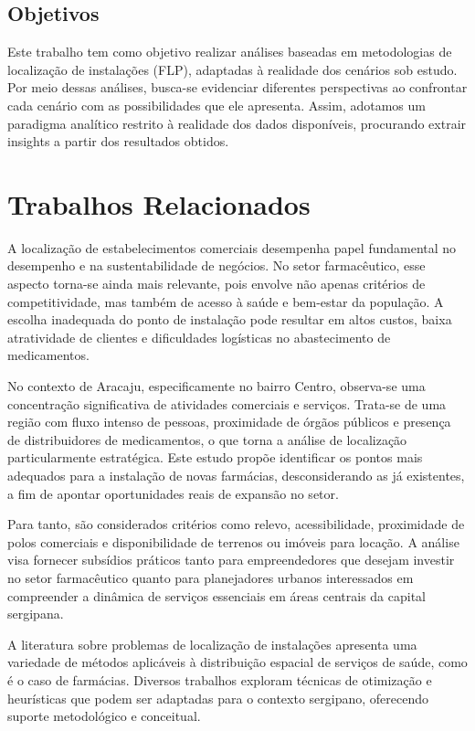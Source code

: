 \documentclass[12pt]{article}
\begin{document}
\subsection{Objetivos}

Este trabalho tem como objetivo realizar análises baseadas em metodologias de localização de instalações (FLP), adaptadas à realidade dos cenários sob estudo. Por meio dessas análises, busca-se evidenciar diferentes perspectivas ao confrontar cada cenário com as possibilidades que ele apresenta. Assim, adotamos um paradigma analítico restrito à realidade dos dados disponíveis, procurando extrair insights a partir dos resultados obtidos.

\section{Trabalhos Relacionados}

A localização de estabelecimentos comerciais desempenha papel fundamental no desempenho e na sustentabilidade de negócios. No setor farmacêutico, esse aspecto torna-se ainda mais relevante, pois envolve não apenas critérios de competitividade, mas também de acesso à saúde e bem-estar da população. A escolha inadequada do ponto de instalação pode resultar em altos custos, baixa atratividade de clientes e dificuldades logísticas no abastecimento de medicamentos.

No contexto de Aracaju, especificamente no bairro Centro, observa-se uma concentração significativa de atividades comerciais e serviços. Trata-se de uma região com fluxo intenso de pessoas, proximidade de órgãos públicos e presença de distribuidores de medicamentos, o que torna a análise de localização particularmente estratégica. Este estudo propõe identificar os pontos mais adequados para a instalação de novas farmácias, desconsiderando as já existentes, a fim de apontar oportunidades reais de expansão no setor.

Para tanto, são considerados critérios como relevo, acessibilidade, proximidade de polos comerciais e disponibilidade de terrenos ou imóveis para locação. A análise visa fornecer subsídios práticos tanto para empreendedores que desejam investir no setor farmacêutico quanto para planejadores urbanos interessados em compreender a dinâmica de serviços essenciais em áreas centrais da capital sergipana.

A literatura sobre problemas de localização de instalações apresenta uma variedade de métodos aplicáveis à distribuição espacial de serviços de saúde, como é o caso de farmácias. Diversos trabalhos exploram técnicas de otimização e heurísticas que podem ser adaptadas para o contexto sergipano, oferecendo suporte metodológico e conceitual.
\end{document}
